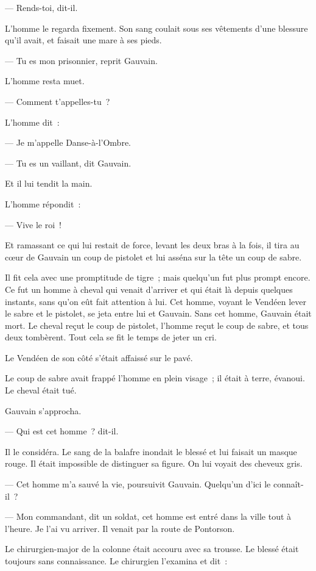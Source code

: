 \documentclass[french,twoside]{book} %
\begin{document}
— Rends-toi, dit-il.\par
L’homme le regarda fixement. Son sang coulait sous ses vêtements d’une blessure qu’il avait, et faisait une mare à ses pieds.\par
— Tu es mon prisonnier, reprit Gauvain.\par
L’homme resta muet.\par
— Comment t’appelles-tu ?\par
L’homme dit :\par
— Je m’appelle Danse-à-l’Ombre.\par
— Tu es un vaillant, dit Gauvain.\par
Et il lui tendit la main.\par
L’homme répondit :\par
— Vive le roi !\par
Et ramassant ce qui lui restait de force, levant les deux bras à la fois, il tira au cœur de Gauvain un coup de pistolet et lui asséna sur la tête un coup de sabre.\par
Il fit cela avec une promptitude de tigre ; mais quelqu’un fut plus prompt encore. Ce fut un homme à cheval qui venait d’arriver et qui était là depuis quelques instants, sans qu’on eût fait attention à lui. Cet homme, voyant le Vendéen lever le sabre et le pistolet, se jeta entre lui et Gauvain. Sans cet homme, Gauvain était mort. Le cheval reçut le coup de pistolet, l’homme  reçut le coup de sabre, et tous deux tombèrent. Tout cela se fit le temps de jeter un cri.\par
Le Vendéen de son côté s’était affaissé sur le pavé.\par
Le coup de sabre avait frappé l’homme en plein visage ; il était à terre, évanoui. Le cheval était tué.\par
Gauvain s’approcha.\par
— Qui est cet homme ? dit-il.\par
Il le considéra. Le sang de la balafre inondait le blessé et lui faisait un masque rouge. Il était impossible de distinguer sa figure. On lui voyait des cheveux gris.\par
— Cet homme m’a sauvé la vie, poursuivit Gauvain. Quelqu’un d’ici le connaît-il ?\par
— Mon commandant, dit un soldat, cet homme est entré dans la ville tout à l’heure. Je l’ai vu arriver. Il venait par la route de Pontorson.\par
Le chirurgien-major de la colonne était accouru avec sa trousse. Le blessé était toujours sans connaissance. Le chirurgien l’examina et dit :\par
\end{document}
